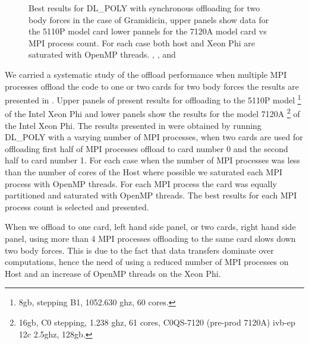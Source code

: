 \begin{figure}[!ht]
\caption{Best results for DL\_POLY with synchronous offloading for two body forces in the case of Gramidicin, 
upper panels show data for the 5110P model card lower pannels for the 7120A model card vs MPI process count. 
For each case both host and Xeon Phi are saturated with OpenMP threads.
, ,  
  and }
\label{fig:offleo}
\end{figure}

\par{We carried a systematic study of the offload performance when multiple MPI processes offload the code to one or two cards 
for two body forces the results are presented in . Upper panels of  present results for 
offloading to the 5110P model \footnote{8gb, stepping B1, 1052.630 ghz, 60 cores.} of the Intel Xeon Phi and lower panels show 
the results for the model 7120A \footnote{ 16gb,  C0 stepping, 1.238 ghz, 61 cores, C0QS-7120 (pre-prod 7120A) ivb-ep 12c 
2.5ghz, 128gb.} of the Intel Xeon Phi. The results presented in  were obtained by running DL\_POLY with a
varying number of MPI processes, when two cards are used for offloading first half of MPI processes offload to card number 0
and the second half to card number 1. For each case when the number of MPI processes was less than the number of cores of the
Host where possible we saturated each MPI process with OpenMP threads. For each MPI process the card was equally partitioned 
and saturated with OpenMP threads. The best results for each MPI process count is selected and presented.}

\par{When we offload to one card, left hand side panel, or two cards, right hand side panel, using more than 4 MPI processes 
offloading to the same card slows down two body forces. This is due to the fact that data transfers dominate over computations, 
hence the need of using a reduced number of MPI processes on Host and an increase of OpenMP threads on the Xeon Phi.}

